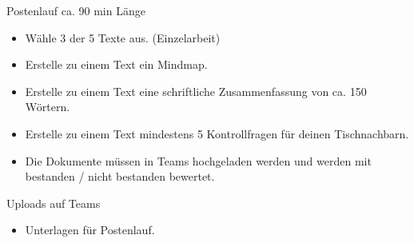 \begin{frame}{Postenlauf}
ca. 90 min Länge
\begin{itemize}
    \item [\textbullet] Wähle 3 der 5 Texte aus. (Einzelarbeit)
    \item [\textbullet] Erstelle zu einem Text ein Mindmap. 
    \item [\textbullet] Erstelle zu einem Text eine schriftliche Zusammenfassung von ca. 150 Wörtern.
    \item [\textbullet] Erstelle zu einem Text mindestens 5 Kontrollfragen für deinen Tischnachbarn.
    \item [\textbullet] Die Dokumente müssen in Teams hochgeladen werden und werden mit bestanden / nicht bestanden bewertet.
\end{itemize}
\end{frame}


    \begin{frame}{Uploads auf Teams}
        \begin{itemize}
            \item[\textbullet] Unterlagen für Postenlauf.
        \end{itemize}
        
    \end{frame}

        
    \folieFragen


    